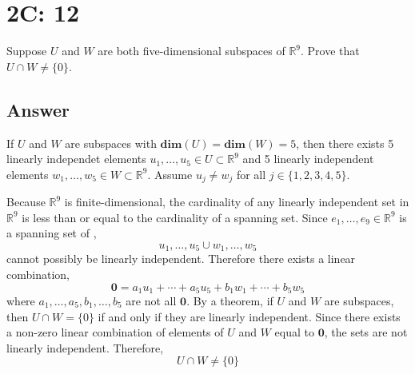 \documentclass[
	12pt, %
]{fphw}
\newcommand\0{\mathbf{0}}
\newcommand\set[1]{\{#1\}}
\newcommand\R[1]{\text{$\mathbb{R}^{#1}$}}
\newcommand\ls[2]{\text{$#1_1, \ldots, #1_{#2}$}}
\renewcommand\dim[1]{\mathbf{dim}(#1)}
\newcommand\lc[3]{#1_1 #2_1 + \cdots + #1_{#3} #2_{#3}}
\begin{document}
\section*{2C: 12}

\begin{problem}
Suppose $U$ and $W$ are both five-dimensional subspaces of $\R{9}$. Prove
that $U \cap W \ne \set{0}$.
\end{problem}


\subsection*{Answer} If $U$ and $W$ are subspaces with $\dim{U} = \dim{W} = 5$, then there exists 5 linearly independet elements $\ls{u}{5} \in U \subset \R{9}$ and 5 linearly independent elements $\ls{w}{5} \in W \subset \R{9}$.  Assume $u_j \ne w_j$ for all $j \in \set{1,2,3,4,5}$.

Because $\R{9}$ is finite-dimensional, the cardinality of any linearly independent set in $\R{9}$ is less than or equal to the cardinality of a spanning set. Since $\ls{e}{9} \in \R{9}$ is a spanning set of \R{9}, 
$$
\ls{u}{5} \cup \ls{w}{5}
$$
cannot possibly be linearly independent. Therefore there exists a linear combination,
$$
\0 = \lc{a}{u}{5} + \lc{b}{w}{5}
$$
where $\ls{a}{5}, \ls{b}{5}$ are not all $\0$. By a theorem, if $U$ and $W$ are subspaces, then $U \cap W =\set{0}$ if and only if they are linearly independent. Since there exists a non-zero linear combination of elements of $U$ and $W$ equal to $\0$, the sets are not linearly independent. Therefore,
$$
U \cap W \ne \set{0}
$$
\end{document}
